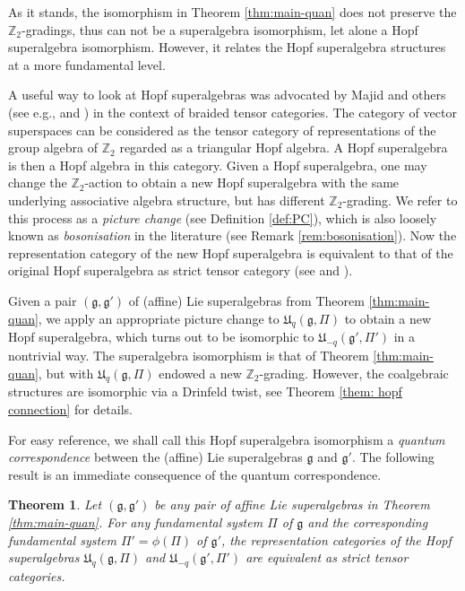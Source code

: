 \documentclass[12pt]{amsart}
\newtheorem{theorem}{Theorem}[section]
\theoremstyle{definition}
\theoremstyle{remark}
\numberwithin{equation}{section}
\begin{document}
As it stands, the isomorphism in Theorem \ref{thm:main-quan}
does not preserve the ${{\mathbb Z}}_2$-gradings, thus can not be a superalgebra isomorphism, let alone a Hopf superalgebra isomorphism.
However, it relates the Hopf superalgebra structures
at a more fundamental level.

A useful way to look at Hopf superalgebras was advocated by Majid  and others (see e.g., \cite[Chapter 10.1]{Ma} and \cite{AEG}) in the context of braided tensor categories.  
The category of vector superspaces can be considered as the tensor category of representations of the group algebra of ${{\mathbb Z}}_2$ regarded as a  triangular Hopf algebra. 
A Hopf superalgebra is then a Hopf algebra in this category.
Given a Hopf superalgebra, one may change the ${{\mathbb Z}}_2$-action to obtain a new Hopf
superalgebra with the same underlying associative algebra structure, but has different ${{\mathbb Z}}_2$-grading.  We refer to this process as a {\em picture change} (see Definition \ref{def:PC}), which is also loosely known as {\em bosonisation} in the literature   \cite{Ma}
(see Remark \ref{rem:bosonisation}).  
Now the representation category of the new Hopf superalgebra is
equivalent to that of the original Hopf superalgebra as strict tensor category (see  \cite[ Chapter 10.1]{Ma} and \cite[Theorem 3.1.1]{AEG}).

Given a pair $({{\mathfrak g}}, {{\mathfrak g}}')$ of (affine) Lie superalgebras from Theorem \ref{thm:main-quan},
we apply an appropriate picture change
to ${{\mathfrak U}}_q({{\mathfrak g}}, \Pi)$ to obtain a new Hopf superalgebra, which turns out to be isomorphic to
 ${{\mathfrak U}}_{-q}({{\mathfrak g}}', \Pi')$ in a nontrivial way.  The superalgebra isomorphism is that of Theorem \ref{thm:main-quan},  but with ${{\mathfrak U}}_q({{\mathfrak g}}, \Pi)$ endowed a new ${{\mathbb Z}}_2$-grading.
However, the coalgebraic structures are isomorphic via a Drinfeld twist, see Theorem \ref{them: hopf connection} for details.

For easy reference, we shall call this Hopf superalgebra isomorphism a  {\em quantum correspondence} between the (affine) Lie superalgebras ${{\mathfrak g}}$ and ${{\mathfrak g}}'$.
The following result is an immediate consequence of the quantum correspondence.
\begin{theorem}\label{thm:tensor-equiv} Let  $({{\mathfrak g}}, {{\mathfrak g}}')$ be 
any pair  of affine Lie superalgebras in Theorem \ref{thm:main-quan}. 
For any fundamental system $\Pi$ of ${{\mathfrak g}}$ and the corresponding  fundamental system $\Pi'=\phi(\Pi)$ of ${{\mathfrak g}}'$,  the representation categories of
the Hopf superalgebras ${{\mathfrak U}}_{q}({{\mathfrak g}}, \Pi)$ and ${{\mathfrak U}}_{-q}({{\mathfrak g}}', \Pi')$ are 
equivalent as strict tensor categories.
\end{theorem}
\end{document}
